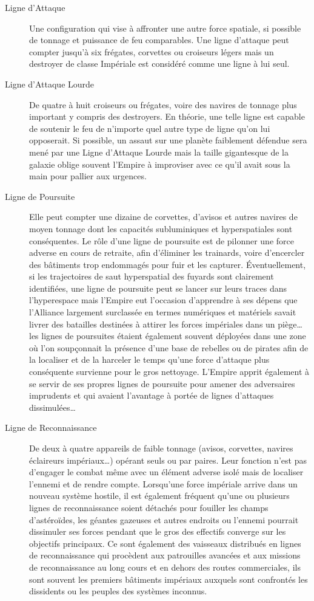 \documentclass[twoside]{article}
\begin{document}
\begin{description}
	\item[Ligne d'Attaque] Une configuration qui vise à affronter une autre force spatiale, si possible de tonnage et puissance de feu comparables. Une ligne d'attaque peut compter jusqu'à six frégates, corvettes ou croiseurs légers mais un destroyer de classe Impériale est considéré comme une ligne à lui seul.
	\item[Ligne d'Attaque Lourde] De quatre à huit croiseurs ou frégates, voire des navires de tonnage plus important y compris des destroyers. En théorie, une telle ligne est capable de soutenir le feu de n'importe quel autre type de ligne qu'on lui opposerait. Si possible, un assaut sur une planète faiblement défendue sera mené par une Ligne d'Attaque Lourde mais la taille gigantesque de la galaxie oblige souvent l'Empire à improviser avec ce qu'il avait sous la main pour pallier aux urgences. 
	\item[Ligne de Poursuite] Elle peut compter une dizaine de corvettes, d'avisos et autres navires de moyen tonnage dont les capacités subluminiques et hyperspatiales sont conséquentes. Le rôle d'une ligne de poursuite est de pilonner une force adverse en cours de retraite, afin d'éliminer les trainards, voire d'encercler des bâtiments trop endommagés pour fuir et les capturer. Éventuellement, si les trajectoires de saut hyperspatial des fuyards sont clairement identifiées, une ligne de poursuite peut se lancer sur leurs traces dans l'hyperespace mais l'Empire eut l'occasion d'apprendre à ses dépens que l'Alliance largement surclassée en termes numériques et matériels savait livrer des batailles destinées à attirer les forces impériales dans un piège\ldots les lignes de poursuites étaient également souvent déployées dans une zone où l'on soupçonnait la présence d'une base de rebelles ou de pirates afin de la localiser et de la harceler le temps qu'une force d'attaque plus conséquente survienne pour le gros nettoyage. L'Empire apprit également à se servir de ses propres lignes de poursuite pour amener des adversaires imprudents et qui avaient l'avantage à portée de lignes d'attaques dissimulées\ldots
	\item[Ligne de Reconnaissance] De deux à quatre appareils de faible tonnage (avisos, corvettes, navires éclaireurs impériaux\ldots) opérant seuls ou par paires. Leur fonction n'est pas d'engager le combat même avec un élément adverse isolé mais de localiser l'ennemi et de rendre compte. Lorsqu'une force impériale arrive dans un nouveau système hostile, il est également fréquent qu'une ou plusieurs lignes de reconnaissance soient détachés pour fouiller les champs d'astéroïdes, les géantes gazeuses et autres endroits ou l'ennemi pourrait dissimuler ses forces pendant que le gros des effectifs converge sur les objectifs principaux. Ce sont également des vaisseaux distribués en lignes de reconnaissance qui procèdent aux patrouilles avancées et aux missions de reconnaissance au long cours et en dehors des routes commerciales, ils sont souvent les premiers bâtiments impériaux auxquels sont confrontés les dissidents ou les peuples des systèmes inconnus.

\end{description}
\end{document}
